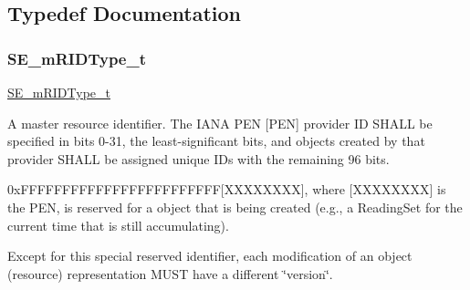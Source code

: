 \subsection{Typedef Documentation}
\mbox{\label{group__mRIDType_gac74622112f3a388a2851b2289963ba5e}} 
\subsubsection{\texorpdfstring{S\+E\+\_\+m\+R\+I\+D\+Type\+\_\+t}{SE\_mRIDType\_t}}
{\footnotesize\ttfamily \hyperlink{group__mRIDType_gac74622112f3a388a2851b2289963ba5e}{S\+E\+\_\+m\+R\+I\+D\+Type\+\_\+t}}

A master resource identifier. The I\+A\+NA P\+EN \mbox{[}P\+EN\mbox{]} provider ID S\+H\+A\+LL be specified in bits 0-\/31, the least-\/significant bits, and objects created by that provider S\+H\+A\+LL be assigned unique I\+Ds with the remaining 96 bits.

0x\+F\+F\+F\+F\+F\+F\+F\+F\+F\+F\+F\+F\+F\+F\+F\+F\+F\+F\+F\+F\+F\+F\+FF\mbox{[}X\+X\+X\+X\+X\+X\+XX\mbox{]}, where \mbox{[}X\+X\+X\+X\+X\+X\+XX\mbox{]} is the P\+EN, is reserved for a object that is being created (e.\+g., a Reading\+Set for the current time that is still accumulating).

Except for this special reserved identifier, each modification of an object (resource) representation M\+U\+ST have a different \char`\"{}version\char`\"{}. 